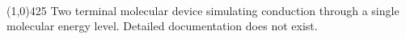 \documentclass{article}
\begin{document}
\\
\hrulefill\linethickness{0.5mm}\line(1,0){425} \normalsize
\newline
Two terminal molecular device simulating conduction through a single molecular energy level. Detailed documentation does not exist.
\end{document}
